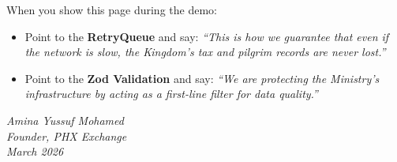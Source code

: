 \documentclass[11pt,a4paper]{article}
\begin{document}
When you show this page during the demo:

\begin{itemize}
  \item Point to the \textbf{RetryQueue} and say: \textit{``This is how we guarantee that even if the network is slow, the Kingdom's tax and pilgrim records are never lost.''}
  \item Point to the \textbf{Zod Validation} and say: \textit{``We are protecting the Ministry's infrastructure by acting as a first-line filter for data quality.''}
\end{itemize}

\vspace{1cm}
\noindent\textit{Amina Yussuf Mohamed}\\
\textit{Founder, PHX Exchange}\\
\textit{March 2026}
\end{document}
